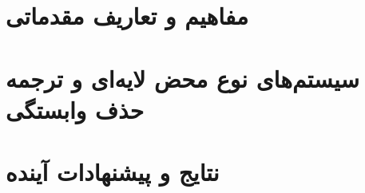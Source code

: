 \documentclass[12pt]{report}
\begin{document}
\listoffigures{}

\listoftables{}


\part{مفاهيم و تعاريف مقدماتی}

\part{سیستم‌های نوع محض لایه‌ای و ترجمه حذف وابستگی}


\part{نتايج و پيشنهادات آينده}
% 




\end{document}
